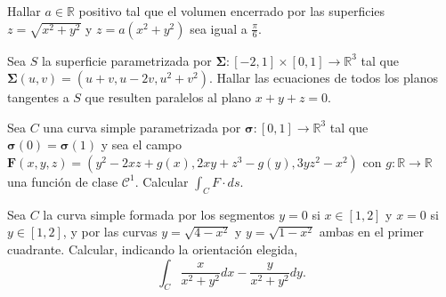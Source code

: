 
\begin{question}
    Hallar $a \in \mathbb{R}$ positivo tal que el volumen encerrado por las superficies 
    $z = \sqrt{x^2+y^2}$ y $z = a \left( x^2+y^2 \right)$ sea igual a $\frac{\pi}{6}$.
\end{question}


\begin{question}
    Sea $S$ la superficie parametrizada por $\boldsymbol{\Sigma}: \left[-2,1\right] \times \left[0,1\right] \rightarrow \mathbb{R}^3$ tal que 
    $\boldsymbol{\Sigma}(u,v) = (u+v,u-2v,u^2+v^2)$. Hallar las ecuaciones de todos los planos tangentes 
    a $S$ que resulten paralelos al plano $x+y+z=0$.
\end{question}


\begin{question}
    Sea $C$ una curva simple parametrizada por $\boldsymbol{\sigma}:[0,1] \rightarrow \mathbb{R}^3$ tal que 
    $\boldsymbol{\sigma}(0)=\boldsymbol{\sigma}(1)$  y sea el campo $\boldsymbol{F}(x,y,z) = (y^2-2xz+g(x),2xy+z^3-g(y),3yz^2-x^2)$
    con $g:\mathbb{R}\rightarrow \mathbb{R}$ una función de clase $\mathcal{C}^1$. Calcular $\int_{C}F \cdot ds$.
\end{question}



\begin{question}
    Sea $C$ la curva simple formada por los segmentos $y=0$ si $x \in [1,2]$ y 
    $x=0$ si $y \in [1,2]$, y por las curvas $y=\sqrt{4-x^2}$ y $y=\sqrt{1-x^2}$ ambas en el primer
    cuadrante. Calcular, indicando la orientación elegida,
    \begin{equation*}
        \int_{C} \frac{x}{x^2+y^2}dx - \frac{y}{x^2+y^2}dy.
    \end{equation*}
\end{question}

